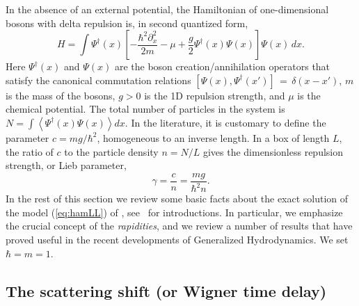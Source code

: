 \documentclass[onecolumn,amsfonts,showpacs,superscriptaddress]{revtex4-1}
\begin{document}
In the absence of an external potential, the Hamiltonian of one-dimensional bosons with delta repulsion is, in second quantized form, 
\begin{equation}
	\label{eq:hamLL}
	H = \int \Psi^\dagger(x) \left[ -\frac{\hbar^2 \partial_x^2}{2m} - \mu + \frac{g}{2} \Psi^\dagger(x) \Psi(x) \right] \Psi(x) \, dx .
\end{equation}
Here $ \Psi^\dagger(x)$ and $ \Psi(x)$ are the boson creation/annihilation operators that satisfy the canonical commutation relations $\left[ \Psi(x) , \Psi^\dagger (x') \right] \, = \, \delta (x-x')$, $m$ is the mass of the bosons, $g>0$ is the 1D repulsion strength, and $\mu$ is the chemical potential. The total number of particles in the system is $N = \int \left< \Psi^\dagger(x) \Psi (x)\right> dx$. In the literature, it is customary to define the parameter $c = mg/\hbar^2$, homogeneous to an inverse length. In a box of length $L$, the ratio of $c$ to the particle density $n=N/L$ gives the dimensionless repulsion strength, or Lieb parameter,
\begin{equation}
	\label{eq:gamma}
	\gamma = \frac{c}{n} = \frac{m g}{\hbar^2 n} .
\end{equation}
In the rest of this section we review some basic facts about the exact solution of the model (\ref{eq:hamLL}) of \cite{lieb1963exact}, see~\citep{korepin1997quantum,gaudin2014bethe} for introductions. In particular, we emphasize the crucial concept of the  {\it rapidities}, and we review a number of results that have proved useful in the recent developments of Generalized Hydrodynamics. We set $\hbar = m =1$.



\subsection{The scattering shift (or Wigner time delay)}
\label{subsec:Wigner}
\end{document}
